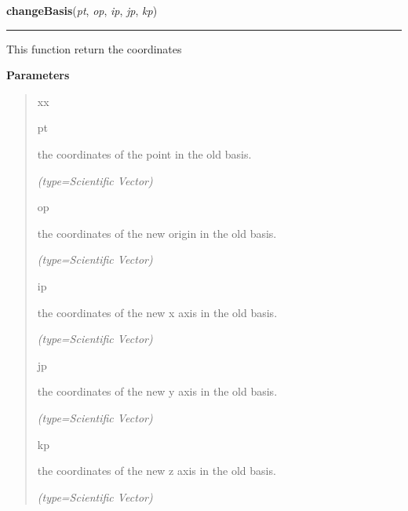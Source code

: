     \label{nMOLDYN:Core:Mathematics:changeBasis}

    \vspace{0.5ex}

\hspace{.8\funcindent}\begin{boxedminipage}{\funcwidth}

    \raggedright \textbf{changeBasis}(\textit{pt}, \textit{op}, \textit{ip}, \textit{jp}, \textit{kp})

    \vspace{-1.5ex}

    \rule{\textwidth}{0.5\fboxrule}
\setlength{\parskip}{2ex}
    This function return the coordinates

\setlength{\parskip}{1ex}
      \textbf{Parameters}
      \vspace{-1ex}

      \begin{quote}
        \begin{Ventry}{xx}

          \item[pt]

          the coordinates of the point in the old basis.

            {\it (type=Scientific Vector)}

          \item[op]

          the coordinates of the new origin in the old basis.

            {\it (type=Scientific Vector)}

          \item[ip]

          the coordinates of the new x axis in the old basis.

            {\it (type=Scientific Vector)}

          \item[jp]

          the coordinates of the new y axis in the old basis.

            {\it (type=Scientific Vector)}

          \item[kp]

          the coordinates of the new z axis in the old basis.

            {\it (type=Scientific Vector)}


\end{Ventry}
\end{quote}
\end{boxedminipage}
